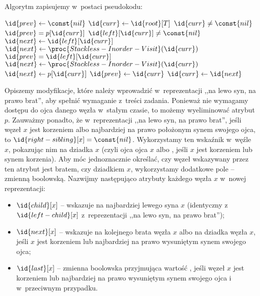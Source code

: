 Algorytm zapisujemy w~postaci pseudokodu:
\begin{codebox}
\li	$\id{prev}\gets\const{nil}$
\li	$\id{curr}\gets\id{root}[T]$
\li	\While $\id{curr}\ne\const{nil}$
\li		\Do
			\If $\id{prev}=p[\id{curr}]$
\li				\Then
					\If $\id{left}[\id{curr}]\ne\const{nil}$
\li						\Then $\id{next}\gets\id{left}[\id{curr}]$
\li						\Else $\id{next}\gets\proc{Stackless-Inorder-Visit}(\id{curr})$
						\End
\li				\ElseIf $\id{prev}=\id{left}[\id{curr}]$
\li					\Then $\id{next}\gets\proc{Stackless-Inorder-Visit}(\id{curr})$
\li				\ElseNoIf $\id{next}\gets p[\id{curr}]$	
				\End
\li			$\id{prev}\gets\id{curr}$
\li			$\id{curr}\gets\id{next}$
		\End
\end{codebox}

\exercise %

\noindent Opiszemy modyfikacje, które należy wprowadzić w~reprezentacji ,,na lewo syn, na prawo brat'', aby spełnić wymaganie z~treści zadania. Ponieważ nie wymagamy dostępu do ojca danego węzła w~stałym czasie, to możemy wyeliminować atrybut $p$. Zauważmy ponadto, że w~reprezentacji ,,na lewo syn, na prawo brat'', jeśli węzeł $x$ jest korzeniem albo najbardziej na prawo położonym synem swojego ojca, to $\id{right-sibling}[x]=\const{nil}$. Wykorzystamy ten wskaźnik w~węźle $x$, pokazując nim na dziadka $x$ (czyli ojca ojca $x$ albo , jeśli $x$ jest korzeniem lub synem korzenia). Aby móc jednoznacznie określać, czy węzeł wskazywany przez ten atrybut jest bratem, czy dziadkiem $x$, wykorzystamy dodatkowe pole -- zmienną boolowską. Nazwijmy następująco atrybuty każdego węzła $x$ w~nowej reprezentacji:
\begin{itemize}
	\item $\id{child}[x]$ -- wskazuje na najbardziej lewego syna $x$ (identyczny z~$\id{left-child}[x]$ z~reprezentacji ,,na lewo syn, na prawo brat'');
	\item $\id{next}[x]$ -- wskazuje na kolejnego brata węzła $x$ albo na dziadka węzła $x$, jeśli $x$ jest korzeniem lub najbardziej na prawo wysuniętym synem swojego ojca;
	\item $\id{last}[x]$ -- zmienna boolowska przyjmująca wartość , jeśli węzeł $x$ jest korzeniem lub najbardziej na prawo wysuniętym synem swojego ojca i~ w~przeciwnym przypadku.
\end{itemize}

